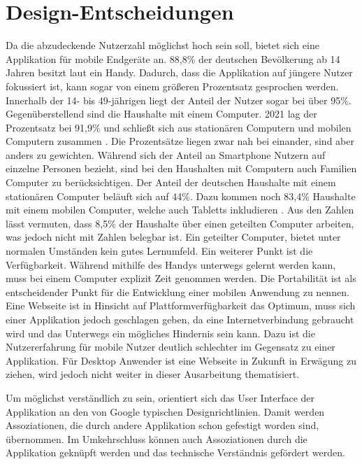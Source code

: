 \section{Design-Entscheidungen}
Da die abzudeckende Nutzerzahl möglichst hoch sein soll, bietet sich eine Applikation für mobile Endgeräte an. 88,8\% der deutschen Bevölkerung ab 14 Jahren besitzt laut \cite{Statista:Smartphonenutzung} ein Handy. Dadurch, dass die Applikation auf jüngere Nutzer fokussiert ist, kann sogar von einem größeren Prozentsatz gesprochen werden. Innerhalb der 14- bis 49-jährigen liegt der Anteil der Nutzer sogar bei über 95\%. Gegenüberstellend sind die Haushalte mit einem Computer. 2021 lag der Prozentsatz bei 91,9\% und schließt sich aus stationären Computern und mobilen Computern zusammen \cite{Statista:Computernutzung}. Die Prozentsätze liegen zwar nah bei einander, sind aber anders zu gewichten. Während sich der Anteil an Smartphone Nutzern auf einzelne Personen bezieht, sind bei den Haushalten mit Computern auch Familien Computer zu berücksichtigen. Der Anteil der deutschen Haushalte mit einem stationären Computer beläuft sich auf 44\%. Dazu kommen noch 83,4\% Haushalte mit einem mobilen Computer, welche auch Tabletts inkludieren \cite{Statista:Computernutzung}. Aus den Zahlen lässt vermuten, dass 8,5\% der Haushalte über einen geteilten Computer arbeiten, was jedoch nicht mit Zahlen belegbar ist. Ein geteilter Computer, bietet unter normalen Umständen kein gutes Lernumfeld. Ein weiterer Punkt ist die Verfügbarkeit. Während mithilfe des Handys unterwegs gelernt werden kann, muss bei einem Computer explizit Zeit genommen werden. Die Portabilität ist als entscheidender Punkt für die Entwicklung einer mobilen Anwendung zu nennen. Eine Webseite ist in Hinsicht auf Plattformverfügbarkeit das Optimum, muss sich einer Applikation jedoch geschlagen geben, da eine Internetverbindung gebraucht wird und das Unterwegs ein mögliches Hindernis sein kann. Dazu ist die Nutzererfahrung für mobile Nutzer deutlich schlechter im Gegensatz zu einer Applikation. Für Desktop Anwender ist eine Webseite in Zukunft in Erwägung zu ziehen, wird jedoch nicht weiter in dieser Ausarbeitung thematisiert.

Um möglichst verständlich zu sein, orientiert sich das User Interface der Applikation an den von Google typischen Designrichtlinien. Damit werden Assoziationen, die durch andere Applikation schon gefestigt worden sind, übernommen. Im Umkehrschluss können auch Assoziationen durch die Applikation geknüpft werden und das technische Verständnis gefördert werden.


